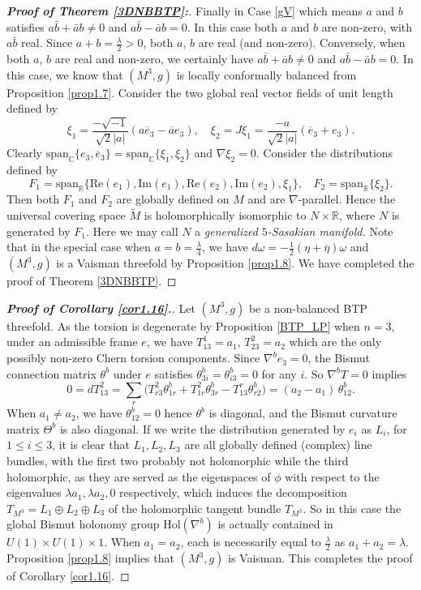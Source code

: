 \documentclass{amsart}
\numberwithin{equation}{section}
\theoremstyle{definition}
\renewcommand{\1}{\mathds{1}}
\renewcommand{\>}{\rightarrow}
\begin{document}
\begin{proof}[{\bf Proof of Theorem \ref{3DNBBTP}:}]
Finally in Case \eqref{gV} which means $a$ and $b$ satisfies $a\bar{b}+\bar{a}b\neq 0$ and $a\bar{b}-\bar{a}b = 0$.
In this case both $a$ and $b$ are non-zero, with $a\bar{b}$ real. Since $a+b=\frac{\lambda}{2}>0$, both $a$, $b$ are real (and non-zero).
Conversely, when both $a$, $b$ are real and non-zero, we certainly have $a\bar{b}+\bar{a}b\neq 0$ and $a\bar{b}-\bar{a}b = 0$.
In this case, we know that $(M^3,g)$ is locally conformally balanced from Proposition \ref{prop1.7}.
Consider the two global real vector fields of unit length defined by
\[ \xi_1 = \frac{-\sqrt{-1}}{\sqrt{2}|a|}(a \overline{e}_3 - \overline{a} e_3 ),\quad
\xi_2 = J \xi_1 =\frac{- a}{\sqrt{2}|a|}( \overline{e}_3 + e_3 ).\]
Clearly $\mbox{span}_{\mathbb{C}} \{e_3,\overline{e}_3\} = \mbox{span}_{\mathbb{C}} \{\xi_1,\xi_2\}$ and $\nabla \xi_2=0$. Consider the distributions defined by
$$ F_1= \mbox{span}_{\mathbb{R}}\{\mathrm{Re}(e_1),\mathrm{Im}(e_1), \mathrm{Re}(e_2),\mathrm{Im}(e_2),\xi_1\}, \ \ \ \ F_2= \mbox{span}_{\mathbb{R}}\{ \xi_2 \}. $$
Then both $F_1$ and $F_2$ are globally defined on $M$ and are $\nabla$-parallel. Hence the universal covering space $\widetilde{M}$ is holomorphically isomorphic to $N \times \mathbb{R}$, where $N$ is generated by $F_1$.
Here we may call $N$ a {\em generalized $5$-Sasakian manifold.}
Note that in the special case  when $a=b=\frac{\lambda}{4}$, we have $d \omega = - \frac{1}{2}(\eta + \overline{\eta}) \omega$ and $(M^3,g)$ is a Vaisman threefold by Proposition \ref{prop1.8}.
We have completed the proof of Theorem \ref{3DNBBTP}.
\end{proof}

\begin{proof}[{\bf Proof of Corollary \ref{cor1.16}.}]
Let $(M^3,g)$ be a non-balanced BTP threefold. As the torsion is degenerate by Proposition \ref{BTP_LP} when $n=3$,
under an admissible frame $e$, we have $T^1_{13}=a_1$, $T^2_{23}=a_2$ which are the only possibly non-zero Chern torsion components.
Since $\nabla^be_3=0$, the Bismut connection matrix $\theta^b$ under $e$ satisfies $\theta^b_{3i}=\theta^b_{i3}=0$ for any $i$. So $\nabla^bT=0$ implies
$$ 0 = dT^2_{13} = \sum_r \big( T^2_{r3} \theta^b_{1r} + T^2_{1r} \theta^b_{3r} - T^r_{13} \theta^b_{r2} \big) = (a_2-a_1)\,\theta^b_{12}.$$
When $a_1\neq a_2$, we have $\theta^b_{12}=0$ hence $\theta^b$ is diagonal, and the Bismut curvature matrix $\Theta^b$ is also diagonal.
If we write the distribution generated by $e_i$ as $L_i$, for $1 \leq i \leq 3$, it is clear that $L_1, L_2, L_3$ are all globally defined (complex) line bundles, with the first two probably not holomorphic while the third holomorphic, as they are served as the eigenspaces of $\phi$ with respect to the eigenvalues $\lambda a_1, \lambda a_2,0$ respectively, which induces the decomposition $T_{M^3}=L_1 \oplus L_2 \oplus L_3$ of the holomorphic tangent bundle $T_{M^3}$. So in this case the global Bismut holonomy group $\mbox{Hol}(\nabla^b)$ is actually contained in $U(1)\times U(1)\times 1$.
When $a_1=a_2$, each is necessarily equal to $\frac{\lambda}{2}$ as $a_1+a_2=\lambda$. Proposition \ref{prop1.8} implies that $(M^3,g)$ is Vaisman. This completes the proof of Corollary \ref{cor1.16}.
\end{proof}
\end{document}
